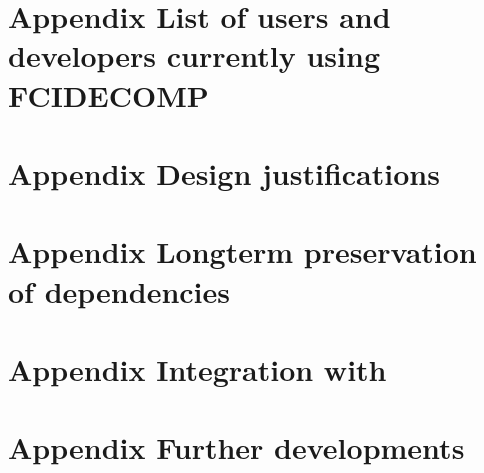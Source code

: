 \documentclass[a4paper,10pt,english]{sphinxmanual}
\begin{document}
\chapter{Appendix \sphinxhyphen{} List of users and developers currently using FCIDECOMP}
\label{\detokenize{a_users_using_fcidecomp:appendix-list-of-users-and-developers-currently-using-fcidecomp}}\label{\detokenize{a_users_using_fcidecomp::doc}}

\chapter{Appendix \sphinxhyphen{} Design justifications}
\label{\detokenize{a_design_justifications:appendix-design-justifications}}\label{\detokenize{a_design_justifications:design-justifications}}\label{\detokenize{a_design_justifications::doc}}

\chapter{Appendix \sphinxhyphen{} Long\sphinxhyphen{}term preservation of dependencies}
\label{\detokenize{a_preservation_of_dependencies:appendix-long-term-preservation-of-dependencies}}\label{\detokenize{a_preservation_of_dependencies::doc}}

\chapter{Appendix \sphinxhyphen{} Integration with }
\label{\detokenize{a_integration_with_hdf5plugin:appendix-integration-with-hdf5plugin}}\label{\detokenize{a_integration_with_hdf5plugin:integration-with-hdf5plugin}}\label{\detokenize{a_integration_with_hdf5plugin::doc}}

\chapter{Appendix \sphinxhyphen{} Further developments}
\label{\detokenize{a_further_developments:appendix-further-developments}}\label{\detokenize{a_further_developments:further-developments}}\label{\detokenize{a_further_developments::doc}}


\renewcommand{\indexname}{Index}
\printindex
\end{document}
